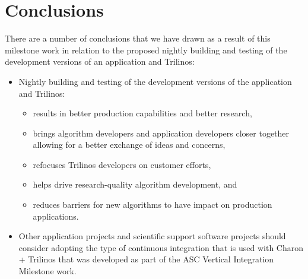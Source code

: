 \documentclass[pdf,ps2pdf,11pt]{SANDreport}
\begin{document}
%
\section{Conclusions}
%

There are a number of conclusions that we have drawn as a result of this
milestone work in relation to the proposed nightly building and testing of the
development versions of an application and Trilinos:

\begin{itemize}

{}\item Nightly building and testing of the development versions of the
application and Trilinos:

  \begin{itemize}

  {}\item results in better production capabilities and better research,

  {}\item brings algorithm developers and application developers closer
  together allowing for a better exchange of ideas and concerns,

  {}\item refocuses Trilinos developers on customer efforts,

  {}\item helps drive research-quality algorithm development, and
        
  {}\item reduces barriers for new algorithms to have impact on production
  applications.

  \end{itemize}

{}\item Other application projects and scientific support software projects
should consider adopting the type of continuous integration that is used with
Charon + Trilinos that was developed as part of the ASC Vertical Integration
Milestone work.

\end{itemize}

%
\clearpage



%
\appendix
\end{document}
